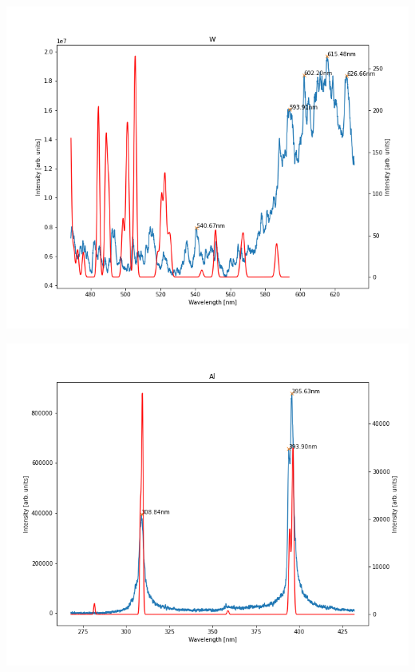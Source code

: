 \documentclass{beamer}
\begin{document}
\begin{frame}
    \includegraphics[scale=0.45]{W/550.png}
\end{frame}

\begin{frame}
    \includegraphics[scale=0.45]{Al/Al_350nm.png}
\end{frame}
\end{document}

